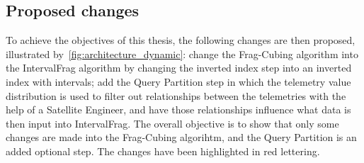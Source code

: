 \subsection{Proposed changes}\label{ch:prop:static:dynamic}

To achieve the objectives of this thesis, the following changes are then proposed, illustrated by~\autoref{fig:architecture_dynamic}: change the Frag-Cubing algorithm into the IntervalFrag algorithm by changing the inverted index step into an inverted index with intervals; add the Query Partition step in which the telemetry value distribution is used to filter out relationships between the telemetries with the help of a Satellite Engineer, and have those relationships influence what data is then input into IntervalFrag.
The overall objective is to show that only some changes are made into the Frag-Cubing algorihtm, and the Query Partition is an added optional step.
The changes have been highlighted in red lettering.

